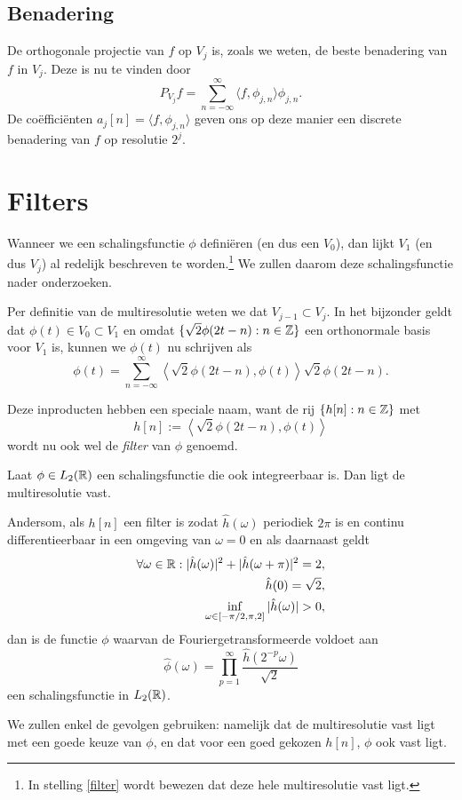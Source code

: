 \subsection{Benadering} De orthogonale projectie van $f$ op $V_j$ is, zoals we weten, de beste benadering van $f$ in $V_j$. Deze is nu te vinden door
\[
P_{V_j} f = \sum_{n=-\infty}^\infty \langle f, \phi_{j,n} \rangle \phi_{j,n}.
\]
De co\"effici\"enten $a_j[n] = \langle f, \phi_{j,n} \rangle$ geven ons op deze manier een discrete benadering van $f$ op resolutie $2^j$.

\section{Filters}
Wanneer we een schalingsfunctie $\phi$ defini\"eren (en dus een $V_0$), dan lijkt $V_1$ (en dus $V_j$) al redelijk beschreven te worden.\footnote{In stelling \ref{filter} wordt bewezen dat deze hele multiresolutie vast ligt.} We zullen daarom deze schalingsfunctie nader onderzoeken.

Per definitie van de multiresolutie weten we dat $V_{j-1} \subset V_j$. In het bijzonder geldt dat $\phi(t) \in V_0 \subset V_1$ en omdat $\{ \sqrt{2}\phi(2t - n): n \in \mathbb{Z}\}$ een orthonormale basis voor $V_1$ is, kunnen we $\phi(t)$ nu schrijven als
\[
\phi(t) = \sum_{n=-\infty}^{\infty} \left\langle \sqrt{2} \phi\left(2t-n\right), \phi(t) \right\rangle \sqrt{2}\phi(2t-n).
\]

\begin{definitie}
  Deze inproducten hebben een speciale naam, want de rij $\{h[n]: n \in \mathbb{Z}\}$ met
  \[
  h[n] := \left\langle \sqrt{2} \phi\left(2t-n\right), \phi(t) \right\rangle
  \]
  wordt nu ook wel de \emph{filter} van $\phi$ genoemd.
\end{definitie}
\begin{stelling}
  \label{filter}
  Laat $\phi \in L_2(\mathbb{R})$ een schalingsfunctie die ook integreerbaar is. Dan ligt de multiresolutie vast.

  Andersom, als $h[n]$ een filter is zodat $\hat{h}(\omega)$ periodiek $2\pi$ is en continu differentieerbaar in een omgeving van $\omega = 0$ en als daarnaast geldt
  \begin{align*}
    \forall \omega \in \mathbb{R}: | \hat{h}(\omega)|^2 + |\hat{h}(\omega + \pi)|^2 = 2, \\
    \hat{h}(0) = \sqrt{2}, \\
    \inf_{\omega \in [-\pi/2, \pi,2]} |\hat{h}(\omega)| > 0,
  \end{align*}
  dan is de functie $\phi$ waarvan de Fouriergetransformeerde voldoet aan
  \[
  \hat{\phi}(\omega) = \prod_{p=1}^\infty \frac{\hat{h}(2^{-p}\omega)}{\sqrt{2}}
  \]
  een schalingsfunctie in $L_2(\mathbb{R})$.
\end{stelling}
We zullen enkel de gevolgen gebruiken: namelijk dat de multiresolutie vast ligt met een goede keuze van $\phi$, en dat voor een goed gekozen $h[n]$, $\phi$ ook vast ligt.

